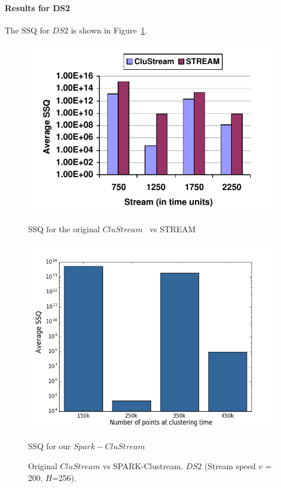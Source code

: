 \paragraph{Results for DS2}
The SSQ for $DS2$ is shown in Figure~\ref{fig:DS2quality}.
    \begin{figure}[!ht]
        \begin{minipage}[l]{1.0\columnwidth}
            \centering
             \includegraphics[width=0.9\columnwidth]{./styles/200h256-orig.png}
            \caption{SSQ for the original $CluStream$~\cite{clustreamOrig} vs STREAM~\cite{}}\label{fig:200h256-orig}
        \end{minipage}
        \hfill{}
        \begin{minipage}[r]{1.0\columnwidth}
            \centering
            \includegraphics[width=0.9\columnwidth]{./styles/200h256.png}
            \caption{SSQ for our $Spark-CluStream$}\label{fig:200h256}
        \end{minipage}
        \captionsetup{labelformat=empty}
        \caption{Original $CluStream$ vs SPARK-Clustream. $DS2$ (Stream speed $v$ = 200, $H$=256).}
        \label{fig:DS2quality}
    \end{figure}
